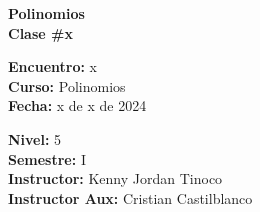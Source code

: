 \begin{center} \textbf
{
    \Large Polinomios \\ \vspace{2mm}Clase \#x
}
\end{center}

\begin{multicols}{2}
{
    \textbf{Encuentro:} x\\
    \textbf{Curso:} Polinomios\\
    \textbf{Fecha:} x de x de 2024\\
    \begin{flushright}
        \textbf{Nivel:} 5\\
        \textbf{Semestre:} I\\
        \textbf{Instructor:} Kenny Jordan Tinoco\\
        \textbf{Instructor Aux:} Cristian Castilblanco
    \end{flushright}
}
\end{multicols}

\thispagestyle{first-page-style}